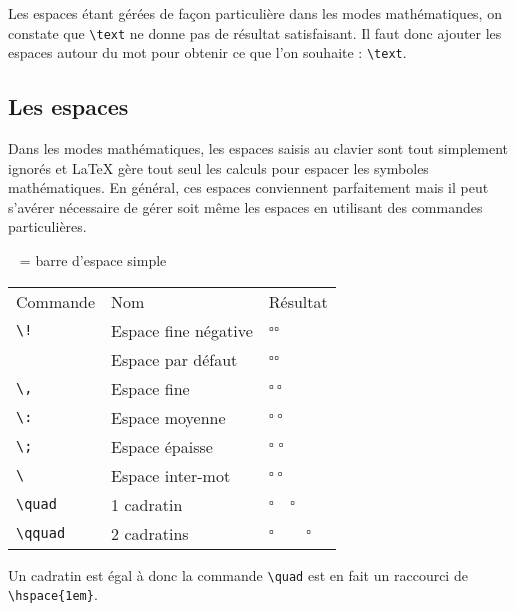 \begin{info}
    Les espaces étant gérées de façon particulière dans les modes mathématiques, on constate que \texttt{\textbackslash text} ne donne pas de résultat satisfaisant. Il faut donc ajouter les espaces autour du mot pour obtenir ce que l'on souhaite : \texttt{\textbackslash text}.
\end{info}

\subsection{Les espaces}
Dans les modes mathématiques, les espaces saisis au clavier sont tout simplement ignorés et \LaTeX{} gère tout seul les calculs pour espacer les symboles mathématiques. En général, ces espaces conviennent parfaitement mais il peut s'avérer nécessaire de gérer soit même les espaces en utilisant des commandes particulières.

\begin{center}
\verb*! ! = barre d'espace simple\par\medskip

	\begin{tabular}{lll}

		\rowcolor{gray!50} Commande & Nom & Résultat  \\
        \verb+\!+ & Espace fine négative & $\square \! \square$\\
        \verb*! ! & Espace par défaut & $\square \square$\\
        \verb+\,+ & Espace fine & $\square \, \square$\\
        \verb+\:+ & Espace moyenne & $\square \: \square$\\
        \verb+\;+ & Espace épaisse & $\square \; \square$\\
        \verb*+\ + & Espace inter-mot & $\square \ \square$\\
        \verb+\quad+ & 1 cadratin & $\square \quad \square$\\
        \verb+\qquad+ & 2 cadratins & $\square \qquad \square$\\
	\end{tabular}
\end{center}

\begin{info}
    Un cadratin est égal à \ordi{1em} donc la commande \texttt{\textbackslash quad} est en fait un raccourci de \texttt{\textbackslash hspace\{1em\}}.
\end{info}

